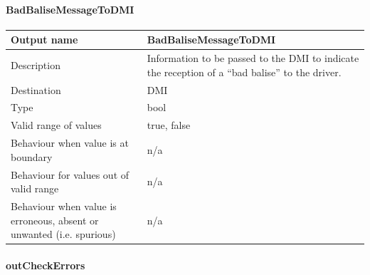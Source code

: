 \paragraph{BadBaliseMessageToDMI}

\begin{longtable}{p{}p{}}
\toprule
Output name				& BadBaliseMessageToDMI \\
\midrule
Description				& Information to be passed to the DMI to indicate the reception of a ``bad balise'' to the driver. \\
\midrule
Destination				& DMI \\ 
\midrule
Type					& bool \\
\midrule
Valid range of values	& true, false\\
\midrule
Behaviour when value is at boundary	& n/a\\
\midrule
Behaviour for values out of valid range	&  n/a\\
\midrule
Behaviour when value is erroneous, absent or unwanted (i.e. spurious) &  n/a\\
\bottomrule
\end{longtable}


\paragraph{outCheckErrors}

